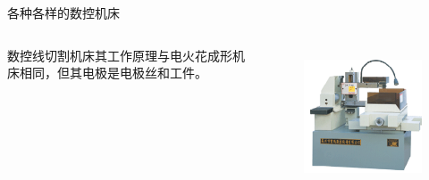 \documentclass[UTF8,zihao=-4]{ctexbeamer}
\begin{document}
\begin{frame}{各种各样的数控机床}
\begin{columns}
	数控线切割机床其工作原理与电火花成形机床相同，但其电极是电极丝和工件。 
	
	\begin{figure}
		\centering
		\includegraphics[width= 0.8\linewidth]{image/1-6}
		\label{fig:1-6}
	\end{figure}
\end{columns}
\end{frame}
\end{document}
